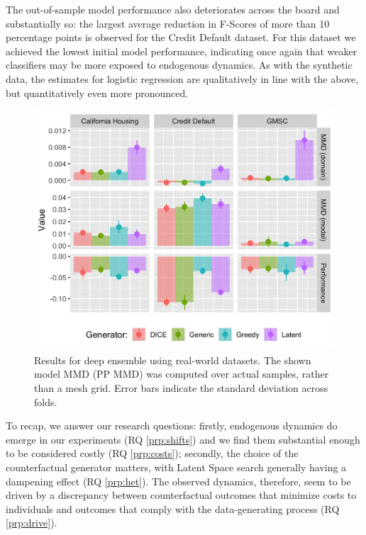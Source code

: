\documentclass[conference,final,]{IEEEtran}
\theoremstyle{definition}
\theoremstyle{definition}
\theoremstyle{definition}
\theoremstyle{definition}
\theoremstyle{remark}
\begin{document}
The out-of-sample model performance also deteriorates across the board and substantially so: the largest average reduction in F-Scores of more than 10 percentage points is observed for the Credit Default dataset. For this dataset we achieved the lowest initial model performance, indicating once again that weaker classifiers may be more exposed to endogenous dynamics. As with the synthetic data, the estimates for logistic regression are qualitatively in line with the above, but quantitatively even more pronounced.

\begin{figure}

{\centering \includegraphics[width=0.9\linewidth]{www/real_world_results} 

}

\caption{Results for deep ensemble using real-world datasets. The shown model MMD (PP MMD) was computed over actual samples, rather than a mesh grid. Error bars indicate the standard deviation across folds.}\label{fig:real}
\end{figure}

To recap, we answer our research questions: firstly, endogenous dynamics do emerge in our experiments (RQ \ref{prp:shifts}) and we find them substantial enough to be considered costly (RQ \ref{prp:costs}); secondly, the choice of the counterfactual generator matters, with Latent Space search generally having a dampening effect (RQ \ref{prp:het}). The observed dynamics, therefore, seem to be driven by a discrepancy between counterfactual outcomes that minimize costs to individuals and outcomes that comply with the data-generating process (RQ \ref{prp:drive}).
\end{document}
